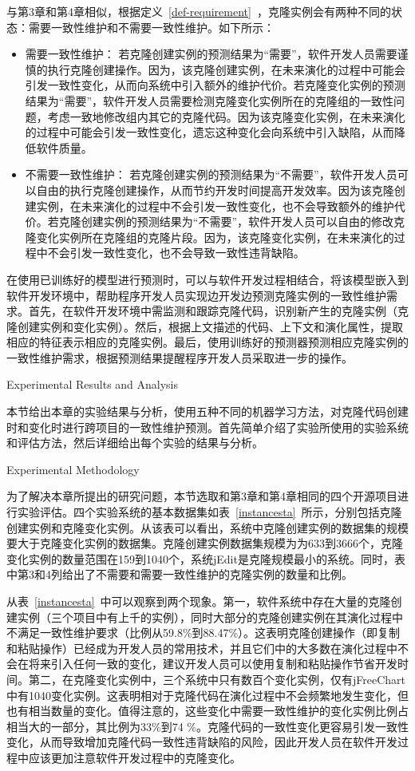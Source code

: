 与第3章和第4章相似，根据定义~\ref{def-requirement}~，克隆实例会有两种不同的状态：需要一致性维护和不需要一致性维护。如下所示：

\begin{itemize}
\item 
需要一致性维护：
若克隆创建实例的预测结果为“需要”，软件开发人员需要谨慎的执行克隆创建操作。因为，该克隆创建实例，在未来演化的过程中可能会引发一致性变化，从而向系统中引入额外的维护代价。若克隆变化实例的预测结果为“需要”，软件开发人员需要检测克隆变化实例所在的克隆组的一致性问题，考虑一致地修改组内其它的克隆代码。因为该克隆变化实例，在未来演化的过程中可能会引发一致性变化，遗忘这种变化会向系统中引入缺陷，从而降低软件质量。
\item
不需要一致性维护：
若克隆创建实例的预测结果为“不需要”，软件开发人员可以自由的执行克隆创建操作，从而节约开发时间提高开发效率。因为该克隆创建实例，在未来演化的过程中不会引发一致性变化，也不会导致额外的维护代价。若克隆创建实例的预测结果为“不需要”，软件开发人员可以自由的修改克隆变化实例所在克隆组的克隆片段。因为，该克隆变化实例，在未来演化的过程中不会引发一致性变化，也不会导致一致性违背缺陷。
\end{itemize}

在使用已训练好的模型进行预测时，可以与软件开发过程相结合，将该模型嵌入到软件开发环境中，帮助程序开发人员实现边开发边预测克隆实例的一致性维护需求。首先，在软件开发环境中需监测和跟踪克隆代码，识别新产生的克隆实例（克隆创建实例和变化实例）。然后，根据上文描述的代码、上下文和演化属性，提取相应的特征表示相应的克隆实例。最后，使用训练好的预测器预测相应克隆实例的一致性维护需求，根据预测结果提醒程序开发人员采取进一步的操作。

{Experimental Results and Analysis}

本节给出本章的实验结果与分析，使用五种不同的机器学习方法，对克隆代码创建时和变化时进行跨项目的一致性维护预测。首先简单介绍了实验所使用的实验系统和评估方法，然后详细给出每个实验的结果与分析。

{Experimental Methodology}

为了解决本章所提出的研究问题，本节选取和第3章和第4章相同的四个开源项目进行实验评估。四个实验系统的基本数据集如表~\ref{instancesta}~所示，分别包括克隆创建实例和克隆变化实例。从该表可以看出，系统中克隆创建实例的数据集的规模要大于克隆变化实例的数据集。克隆创建实例数据集规模为为633到3666个，克隆变化实例的数量范围在159到1040个，系统jEdit是克隆规模最小的系统。同时，表中第3和4列给出了不需要和需要一致性维护的克隆实例的数量和比例。


从表~\ref{instancesta}~中可以观察到两个现象。第一，软件系统中存在大量的克隆创建实例（三个项目中有上千的实例），同时大部分的克隆创建实例在其演化过程中不满足一致性维护要求（比例从59.8\%到88.47\%）。这表明克隆创建操作（即复制和粘贴操作）已经成为开发人员的常用技术，并且它们中的大多数在演化过程中不会在将来引入任何一致的变化，建议开发人员可以使用复制和粘贴操作节省开发时间。第二，在克隆变化实例中，三个系统中只有数百个变化实例，仅有jFreeChart中有1040变化实例。这表明相对于克隆代码在演化过程中不会频繁地发生变化，但也有相当数量的变化。值得注意的，这些变化中需要一致性维护的变化实例比例占相当大的一部分，其比例为33\%到74 \%。克隆代码的一致性变化更容易引发一致性变化，从而导致增加克隆代码一致性违背缺陷的风险，因此开发人员在软件开发过程中应该更加注意软件开发过程中的克隆变化。

